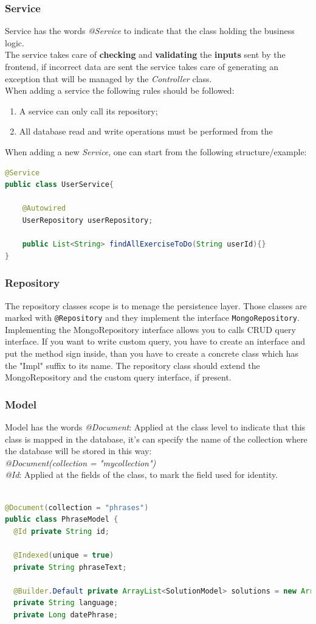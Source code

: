 \subsubsection{Service}
Service has the words \textit{@Service} to indicate that the class holding the business logic.\\
The service takes care of \textbf{checking} and \textbf{validating} the \textbf{inputs} sent by the frontend, if incorrect data are sent the service takes care of generating an exception that will be managed by the \textit{Controller} class.\\
When adding a service the following rules should be followed: 
\begin{enumerate}
\item A service can only call its repository;
\item All database read and write operations must be performed from the
\end{enumerate}
When adding a new \textit{Service}, one can start from the following structure/example:
\begin{lstlisting}[language=Java]
@Service
public class UserService{

	@Autowired
	UserRepository userRepository; 
	
	public List<String> findAllExerciseToDo(String userId){} 
}
\end{lstlisting}

\subsubsection{Repository}
The repository classes scope is to menage the persistence layer. Those classes are marked with \texttt{@Repository} and they implement the interface \texttt{MongoRepository}. Implementing the MongoRepository interface allows you to calls CRUD query interface. 
If you want to write custom query, you have to create an interface and put the method sign inside, than you have to create a concrete class which has the "Impl" suffix to its name. The repository class should extend the MongoRepository and the custom query interface, if present. 
\subsubsection{Model}
Model has the words \textit{@Document}: Applied at the class level to indicate that this class is mapped in the database, it's can specify the name of the collection where the database will be stored in this way:\\ \textit{@Document(collection = "mycollection")}\\
\textit{@Id}: Applied at the fields of the class, to mark the field used for identity.

\begin{lstlisting}[language=Java]

@Document(collection = "phrases")
public class PhraseModel {
  @Id private String id;

  @Indexed(unique = true)
  private String phraseText;

  @Builder.Default private ArrayList<SolutionModel> solutions = new ArrayList<>();
  private String language;
  private Long datePhrase;
 \end{lstlisting}